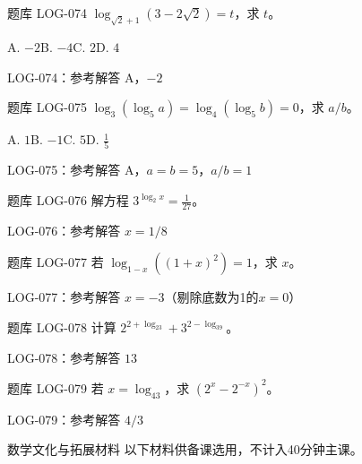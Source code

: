 \documentclass[aspectratio=169,10pt]{beamer}
\begin{document}
\begin{campuspractice}{题库 LOG-074}
$\log_{\sqrt2+1}(3-2\sqrt2)=t$，求 $t$。\par A. $-2$\quad B. $-4$\quad C. $2$\quad D. $4$
\end{campuspractice}

\ifdefined\TeacherEdition
\begin{frame}[t]{LOG-074：参考解答}
A，$-2$
\end{frame}
\fi

\begin{campuspractice}{题库 LOG-075}
$\log_3(\log_5a)=\log_4(\log_5b)=0$，求 $a/b$。\par A. $1$\quad B. $-1$\quad C. $5$\quad D. $\frac{1}{5}$
\end{campuspractice}

\ifdefined\TeacherEdition
\begin{frame}[t]{LOG-075：参考解答}
A，$a=b=5$，$a/b=1$
\end{frame}
\fi

\begin{campuspractice}{题库 LOG-076}
解方程 $3^{\log_2x}=\frac{1}{27}$。
\end{campuspractice}

\ifdefined\TeacherEdition
\begin{frame}[t]{LOG-076：参考解答}
$x=1/8$
\end{frame}
\fi

\begin{campuspractice}{题库 LOG-077}
若 $\log_{1-x}((1+x)^2)=1$，求 $x$。
\end{campuspractice}

\ifdefined\TeacherEdition
\begin{frame}[t]{LOG-077：参考解答}
$x=-3$（剔除底数为1的$x=0$）
\end{frame}
\fi

\begin{campuspractice}{题库 LOG-078}
计算 $2^{2+\log_23}+3^{2-\log_39}$。
\end{campuspractice}

\ifdefined\TeacherEdition
\begin{frame}[t]{LOG-078：参考解答}
$13$
\end{frame}
\fi

\begin{campuspractice}{题库 LOG-079}
若 $x=\log_43$，求 $(2^x-2^{-x})^2$。
\end{campuspractice}

\ifdefined\TeacherEdition
\begin{frame}[t]{LOG-079：参考解答}
$4/3$
\end{frame}
\fi

\begin{frame}[t]{数学文化与拓展材料}
以下材料供备课选用，不计入40分钟主课。
\end{frame}


\campusclosing[谢谢]
\end{document}
